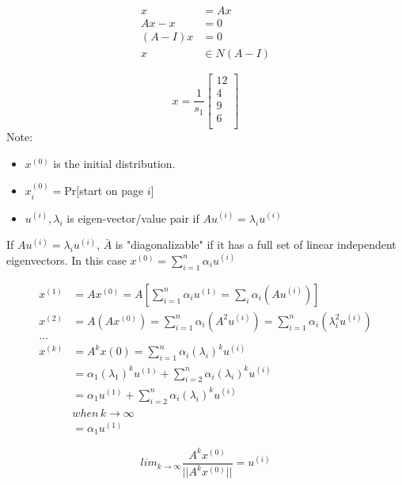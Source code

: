 \begin{align*}
x &= Ax \\
Ax - x &= 0\\
(A - I)x &= 0\\
x&\in N(A-I)
\end{align*}


$$
x = \frac{1}{s_1}
\left[
\begin{matrix}
12 \\
4 \\
9\\
6\\
\end{matrix}
\right]
$$
Note: 

\begin{itemize}
	\item $x^{(0)}$ is the initial distribution.
	
	\item $x^{(0)}_i = $Pr[start on page $i$]
	
	\item $u^{(i)}, \lambda_i$ is eigen-vector/value pair if $Au^{(i)} = \lambda_iu^{(i)}$
\end{itemize}


If $Au^{(i)} = \lambda_iu^{(i)}$, $\bar{A}$ is "diagonalizable" if it has a full set of linear independent eigenvectors. In this case $x^{(0)} = \sum^n_{i=1}\alpha_iu^{(i)}$

\begin{align*}
x^{(1)} &= Ax^{(0)} = A[\sum^n_{i=1}\alpha_iu^{(1)} = \sum_i\alpha_i(Au^{(i)})]\\
x^{(2)} &= A(Ax^{(0)}) = \sum^n_{i=1}\alpha_i(A^2u^{(i)}) = \sum^n_{i=1}\alpha_i(\lambda_i^2u^{(i)})\\
...\\
x^{(k)} &= A^kx{(0)} = \sum^n_{i=1}\alpha_i(\lambda_i)^ku^{(i)}\\
&= \alpha_1(\lambda_1)^ku^{(1)} + \sum^n_{i=2}\alpha_i(\lambda_i)^ku^{(i)} \\
&= \alpha_1u^{(1)} + \sum^n_{i=2}\alpha_i(\lambda_i)^ku^{(i)}\\
&when \,k \rightarrow \infty\\
&= \alpha_1u^{(1)}
\end{align*}

\begin{equation*}
lim_{k\rightarrow \infty}\frac{A^kx^{(0)}}{||A^kx^{(0)}||} =u^{(i)}
\end{equation*}


